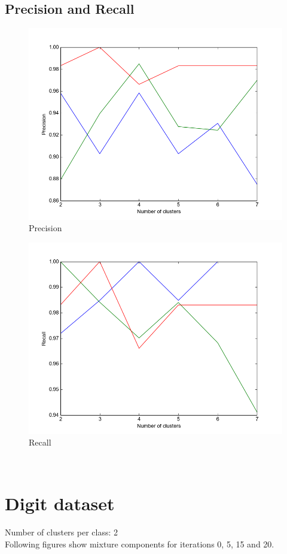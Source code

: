 \documentclass[11pt,a4paper]{article}
\begin{document}
\subsection{Precision and Recall}

\begin{minipage}[b]{0.5\textwidth}
\begin{figure}[H]
  \centering
  \includegraphics[width=.8\linewidth]{Figures/GMM_precisionvsk_BGR.png}
  \caption{Precision}
  \label{fig:sfig1}
\end{figure}%
\end{minipage}
\begin{minipage}[b]{0.5\textwidth}
\begin{figure}[H]
  \centering
  \includegraphics[width=.8\linewidth]{Figures/GMM_recallvsk_BGR.png}
\caption{Recall}
  \label{fig:sfig1}
\end{figure}%
\end{minipage}
\\

\section{Digit dataset}
Number of clusters per class: 2
\\Following figures show mixture components for iterations 0, 5, 15 and 20. 
\end{document}
